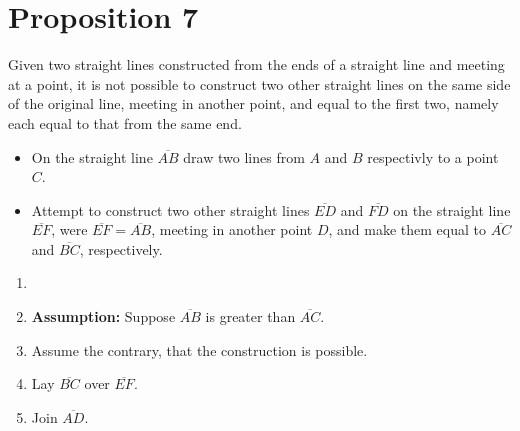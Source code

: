 
\section*{Proposition 7}%

\begin{thm}
Given two straight lines constructed from the ends of a straight line and meeting at a point, it is not possible to construct two other straight lines on the same side of the original line, meeting in another point, and equal to the first two, namely each equal to that from the same end.
\end{thm}

\begin{figure}[H]
\centering
	\begin{subfigure}{0.35\textwidth}

		\caption{}
	\end{subfigure}	
	\begin{subfigure}{0.35\textwidth}

		\caption{}
	\end{subfigure}
	\caption{}
\end{figure}


\begin{itemize}

\item On the straight line $\overline{AB}$ draw two lines from $A$ and $B$ respectivly to a point $C$.
\item Attempt to construct two other straight lines $\overline{ED}$ and $\overline{FD}$ on the straight line $\overline{EF}$, were $\overline{EF}=\overline{AB}$, meeting in another point $D$, and make them equal to $\overline{AC}$ and $\overline{BC}$, respectively.

\end{itemize}

	\begin{enumerate}
\item[]
    	\item \textbf{Assumption:} Suppose $\overline{AB}$ is greater than $\overline{AC}$.

	\item Assume the contrary, that the construction is possible.

	\item Lay $\overline{BC}$ over $\overline{EF}$.
	
	\item Join $\overline{AD}$.
	
	\end{enumerate}
	

